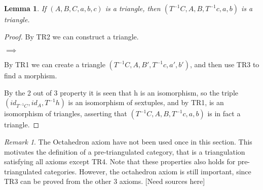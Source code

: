 \documentclass[12pt]{article}
\newtheorem{lemma}[theorem]{Lemma}
\theoremstyle{definition}
\theoremstyle{remark}
\newtheorem*{remark}{Remark}
\begin{document}
            \begin{lemma}
                If $(A,B,C,a,b,c)$ is a triangle, then $(T^{-1}C,A,B,T^{-1}c,a,b)$ is a triangle.
            \end{lemma}

            \begin{proof}
                By TR2 we can construct a triangle.
                \begin{center}
                    $\implies$
                \end{center}
                By TR1 we can create a triangle $(T^{-1}C,A,B',T^{-1}c,a',b')$, and then use TR3 to find a morphism.
                \begin{center}
                \end{center}
                By the 2 out of 3 property it is seen that h is an isomorphism, so the triple $(id_{T^{-1}C}, id_A, T^{-1}h)$ is an isomorphism of sextuples, and by TR1, is an isomorphism of triangles, asserting that $(T^{-1}C,A,B,T^{-1}c,a,b)$ is in fact a triangle.
            \end{proof}

            \begin{remark}
                The Octahedron axiom have not been used once in this section. This motivates the definition of a pre-triangulated category, that is a triangulation satisfying all axioms except TR4. Note that these properties also holds for pre-triangulated categories. However, the octahedron axiom is still important, since TR3 can be proved from the other 3 axioms. [Need sources here]
            \end{remark}
\end{document}
